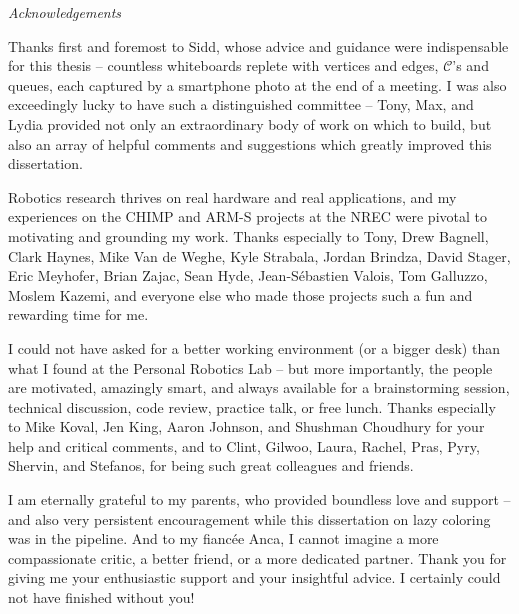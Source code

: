 
\begin{fullwidth}
\begin{adjustwidth}{1in}{1in}

{\LARGE \emph{Acknowledgements}}

\vspace{0.2in}

Thanks first and foremost to Sidd,
whose advice and guidance were indispensable for
this thesis
-- countless whiteboards replete with
vertices and edges, $\mathcal{C}$'s and queues,
each captured by a smartphone photo at the end of a meeting.
I was also exceedingly lucky to have such a distinguished
committee --
Tony, Max, and Lydia provided not only an extraordinary body of work
on which to build,
but also an array of helpful comments and suggestions which greatly
improved this dissertation.

\vspace{0.2cm}

Robotics research thrives on real hardware and real applications,
and my experiences on the CHIMP and ARM-S projects
at the NREC were pivotal to motivating and grounding my work.
Thanks especially to Tony, Drew Bagnell,
Clark Haynes, Mike Van de Weghe, Kyle Strabala, Jordan Brindza,
David Stager, Eric Meyhofer, Brian Zajac, Sean Hyde,
Jean-S\'{e}bastien Valois, Tom Galluzzo, Moslem Kazemi,
and everyone else who made those projects such a fun and rewarding
time for me.

\vspace{0.2cm}

I could not have asked for a better working environment
(or a bigger desk)
than what I found at the Personal Robotics Lab
-- but more importantly,
the people are motivated, amazingly smart, and always available
for a brainstorming session, technical discussion, code review,
practice talk, or free lunch.
Thanks especially to Mike Koval, Jen King, Aaron Johnson,
and Shushman Choudhury for your help and critical comments,
and to Clint, Gilwoo, Laura, Rachel, Pras, Pyry, Shervin, and Stefanos,
for being such great colleagues and friends.

\vspace{0.2cm}

I am eternally grateful to my parents,
who provided boundless love and support
-- and also very persistent encouragement
while this dissertation on lazy coloring was in the pipeline.
And to my fianc\'{e}e Anca,
I cannot imagine
a more compassionate critic,
a better friend,
or a more dedicated partner.
Thank you for giving me your enthusiastic support
and your insightful advice.
I certainly could not have finished without you!

\end{adjustwidth}
\end{fullwidth}

